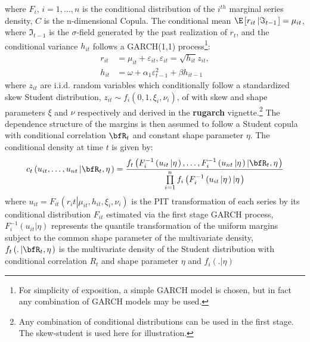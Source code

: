 where $F_i$, $i=1,\dots,n$ is the conditional distribution of the $i^{th}$
marginal series density, $C$ is the n-dimensional Copula. The conditional mean
$\E\left[ {{r_{it}}\left| {{\Im _{t - 1}}} \right.} \right] = {\mu _{it}}$,
where $\Im _{t - 1}$ is the $\sigma$-field generated by the past realization of
$r_t$, and the conditional variance $h_{it}$ follows a GARCH(1,1)
process\footnote{For simplicity of exposition, a simple GARCH model is chosen,
but in fact any combination of GARCH models may be used.}:
\begin{align}\label{eq:copula12}
{r_{it}} &= {\mu _{it}} + {\varepsilon _{it}},{\varepsilon _{it}} = \sqrt {{h_{it}}} {z_{it}},\\
{h_{it}} &= \omega  + {\alpha _1}\varepsilon _{t - 1}^2 + \beta {h_{it - 1}}
\end{align}
where $z_{it}$ are i.i.d. random variables which conditionally follow a standardized
skew Student distribution, $z_{it}\sim {f}_{i}(0,1,\xi_i,\nu_i)$, of \cite{Fernandez1998}
with skew and shape parameters $\xi$ and $\nu$ respectively and derived in
the  {\bf {rugarch}} vignette.\footnote{Any combination of conditional distributions
can be used in the first stage. The skew-student is used here for illustration.}
The dependence structure of the margins is then assumed to follow a Student copula
with conditional correlation $\bfR_t$ and constant shape parameter $\eta$. The
conditional density at time $t$ is given by:
\begin{equation}\label{eq:copula13}
{c_t}\left( {{u_{it}},\dots,{u_{nt}}\left| {{\bfR_t},\eta } \right.} \right) = \frac{{{f_t}\left( {F_i^{ - 1}\left( {{u_{it}}\left| \eta  \right.} \right),\dots,F_i^{ - 1}\left( {{u_{nt}}\left| \eta  \right.} \right)\left| {{\bfR_t},\eta } \right.} \right)}}{{\prod\limits_{i = 1}^n {{f_i}\left( {F_i^{ - 1}\left( {{u_{it}}\left| \eta  \right.} \right)\left| \eta  \right.} \right)} }}
\end{equation}
where $u_{it}=F_{it}\left(r_it\left|\mu_{it},h_{it},\xi_{i},\nu_{i}\right.\right)$
is the PIT transformation of each series by its conditional distribution $F_{it}$
estimated via the first stage GARCH process, ${F_i^{ - 1}\left( {{u_{it}}\left| \eta  \right.} \right)}$
represents the quantile transformation of the uniform margins subject to the common
shape parameter of the multivariate density, ${{f_t}\left( .\left| {{\bfR_t},\eta } \right. \right)}$
is the multivariate density of the Student distribution with conditional correlation
$R_t$ and shape parameter $\eta$ and ${f_i}\left( .\left| \eta  \right.\right)$
